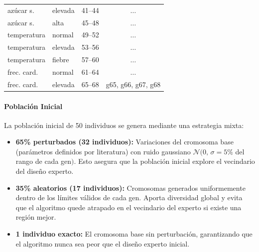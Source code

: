 \documentclass[11pt]{article}
\begin{document}
\begin{table}[H]
\begin{tabular}{llcccc}
        az\'ucar s.       & elevada              & 41--44         & \multicolumn{3}{c}{$\ldots$}                              \\
        az\'ucar s.       & alta                 & 45--48         & \multicolumn{3}{c}{$\ldots$}                              \\
        temperatura       & normal               & 49--52         & \multicolumn{3}{c}{$\ldots$}                              \\
        temperatura       & elevada              & 53--56         & \multicolumn{3}{c}{$\ldots$}                              \\
        temperatura       & fiebre               & 57--60         & \multicolumn{3}{c}{$\ldots$}                              \\
        frec. card.       & normal               & 61--64         & \multicolumn{3}{c}{$\ldots$}                              \\
        frec. card.       & elevada              & 65--68         & \multicolumn{3}{c}{g65, g66, g67, g68}                    \\
        \bottomrule
    \end{tabular}
    \label{tab:cromosoma}
    \par{}
\end{table}

\paragraph{Población Inicial}

La poblaci\'on inicial de 50 individuos se genera mediante una estrategia mixta:

\begin{itemize}
    \item \textbf{65\% perturbados (32 individuos):} Variaciones del cromosoma base (par\'ametros definidos por literatura) con ruido gaussiano $\mathcal{N}(0,\, \sigma = 5\%$ del rango de cada gen$)$. Esto asegura que la poblaci\'on inicial explore el vecindario del dise\~no experto.
    \item \textbf{35\% aleatorios (17 individuos):} Cromosomas generados uniformemente dentro de los l\'imites v\'alidos de cada gen. Aporta diversidad global y evita que el algoritmo quede atrapado en el vecindario del experto si existe una regi\'on mejor.
    \item \textbf{1 individuo exacto:} El cromosoma base sin perturbaci\'on, garantizando que el algoritmo nunca sea peor que el dise\~no experto inicial.
\end{itemize}
\end{document}
